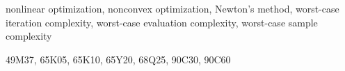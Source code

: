 \documentclass[review]{siamart220329}
\title{}
\author{Frank E. Curtis\footnotemark[1]
   \and Lingjun Guo\footnotemark[1]
   \and Daniel P.~Robinson\footnotemark[1]}
\date  {\today}
\begin{document}
\maketitle

\renewcommand{\thefootnote}{\fnsymbol{footnote}}
\renewcommand{\thefootnote}{\arabic{footnote}}

\begin{abstract}
  
\end{abstract}

\begin{keywords}
  nonlinear optimization, nonconvex optimization, Newton's method, worst-case iteration complexity, worst-case evaluation complexity, worst-case sample complexity
\end{keywords}

\begin{AMS}
  49M37, 65K05, 65K10, 65Y20, 68Q25, 90C30, 90C60
\end{AMS}





\end{document}
